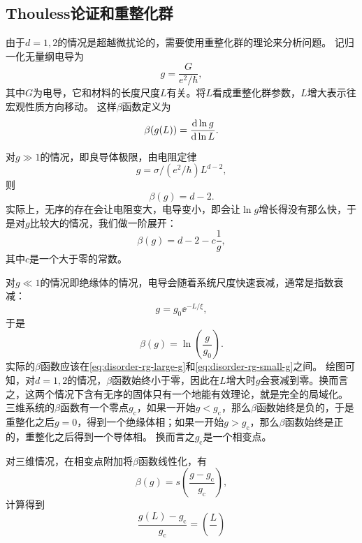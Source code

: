 \subsection{Thouless论证和重整化群}

由于$d=1, 2$的情况是超越微扰论的，需要使用重整化群的理论来分析问题。
记归一化无量纲电导为
\begin{equation}
    g = \frac{G}{e^2 / \hbar},
\end{equation}
其中$G$为电导，它和材料的长度尺度$L$有关。将$L$看成重整化群参数，$L$增大表示往宏观性质方向移动。
这样$\beta$函数定义为
\begin{equation}
    \beta(g(L)) = \dv{\ln g}{\ln L}.    
\end{equation}

对$g \gg 1$的情况，即良导体极限，由电阻定律
\[
    g = \sigma / (e^2 / \hbar) L^{d-2},
\]
则
\[
    \beta(g) = d - 2.
\]
实际上，无序的存在会让电阻变大，电导变小，即会让$\ln g$增长得没有那么快，于是对$g$比较大的情况，我们做一阶展开：
\begin{equation}
    \beta(g) = d - 2 - c \frac{1}{g},
    \label{eq:disorder-rg-large-g}
\end{equation}
其中$c$是一个大于零的常数。

对$g \ll 1$的情况即绝缘体的情况，电导会随着系统尺度快速衰减，通常是指数衰减：
\[
    g = g_0 \ee^{- L / \xi},
\]
于是
\begin{equation}
    \beta(g) = \ln(\frac{g}{g_0}).
    \label{eq:disorder-rg-small-g}
\end{equation}
实际的$\beta$函数应该在\eqref{eq:disorder-rg-large-g}和\eqref{eq:disorder-rg-small-g}之间。
绘图可知，对$d=1, 2$的情况，$\beta$函数始终小于零，因此在$L$增大时$g$会衰减到零。换而言之，这两个情况下含有无序的固体只有一个地能有效理论，就是完全的局域化。
三维系统的$\beta$函数有一个零点$g_\text{c}$，如果一开始$g < g_\text{c}$，那么$\beta$函数始终是负的，于是重整化之后$g=0$，得到一个绝缘体相；如果一开始$g > g_\text{c}$，那么$\beta$函数始终是正的，重整化之后得到一个导体相。
换而言之$g_\text{c}$是一个相变点。

对三维情况，在相变点附加将$\beta$函数线性化，有
\begin{equation}
    \beta(g) = s \left( \frac{g - g_\text{c}}{g_\text{c}} \right),
\end{equation}
计算得到
\begin{equation}
    \frac{g(L) - g_\text{c}}{g_\text{c}} = \left( \frac{L}{} \right)
\end{equation}
